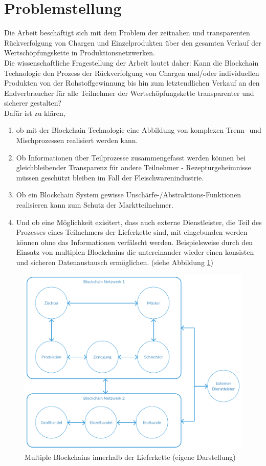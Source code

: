 \section{Problemstellung}

Die Arbeit beschäftigt sich mit dem Problem der zeitnahen und transparenten Rückverfolgung von Chargen und Einzelprodukten über den gesamten Verlauf der Wertschöpfungskette in Produktionsnetzwerken.\\

Die wissenschaftliche Fragestellung der Arbeit lautet daher: Kann die Blockchain Technologie den Prozess der Rückverfolgung von Chargen und/oder individuellen Produkten von der Rohstoffgewinnung bis hin zum letztendlichen Verkauf an den Endverbraucher für alle Teilnehmer der Wertschöpfungskette transparenter und sicherer gestalten?\\

Dafür ist zu klären,

\begin{enumerate}
  \item ob mit der Blockchain Technologie eine Abbildung von komplexen Trenn- und Mischprozessen realisiert werden kann.
  \item Ob Informationen über Teilprozesse zusammengefasst werden können bei gleichbleibender Transparenz für andere Teilnehmer - Rezepturgeheimnisse müssen geschützt bleiben im Fall der Fleischwarenindustrie.
  \item Ob ein Blockchain System gewisse Unschärfe-/Abstraktions-Funktionen realisieren kann zum Schutz der Marktteilnehmer.
  \item Und ob eine Möglichkeit exisitert, dass auch externe Dienstleister, die Teil des Prozesses eines Teilnehmers der Lieferkette sind, mit eingebunden werden können ohne das Informationen verfälscht werden. Beispielsweise durch den Einsatz von multiplen Blockchains die untereinander wieder einen konsisten und sicheren Datenaustausch ermöglichen. (siehe Abbildung \ref{fig:multi-blockchain-example})
\end{enumerate}

\begin{figure}[h!]
	\centering
	\includegraphics[width=0.8\linewidth]{pictures/Multi-Blockchain-Example}
	\caption[Multiple Blockchains innerhalb der Lieferkette]{Multiple Blockchains innerhalb der Lieferkette (eigene Darstellung)}
	\label{fig:multi-blockchain-example}
\end{figure}

